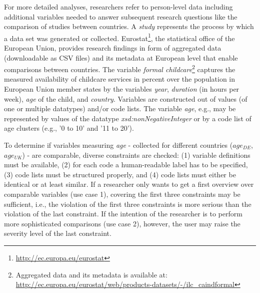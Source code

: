 \documentclass{llncs}
\begin{document}
For more detailed analyses, researchers refer to person-level data including additional variables needed to answer subsequent research questions
like the comparison of studies between countries.
A \emph{study} represents the process by which a data set was generated or collected.
Eurostat\footnote{\url{http://ec.europa.eu/eurostat}}, the statistical office of the European Union, provides research findings in form of aggregated data (downloadable as CSV files) and its metadata at European level that enable comparisons between countries.
The variable \emph{formal childcare}\footnote{Aggregated data and its metadata is available at: \url{http://ec.europa.eu/eurostat/web/products-datasets/-/ilc_caindformal}} %
captures the measured availability of childcare services in percent over the population in European Union member states by 
the variables \emph{year}, \emph{duration} (in hours per week), \emph{age} of the child, and \emph{country}.
Variables are constructed out of values (of one or multiple datatypes) and/or code lists.
The variable \emph{age}, e.g., may be represented by values of the datatype \emph{xsd:nonNegativeInteger} or by a code list of age clusters (e.g., '0 to 10' and '11 to 20'). 

To determine if variables measuring \emph{age} 
- collected for different countries (\emph{$age_{DE}$}, \emph{$age_{UK}$}) - 
are comparable, diverse constraints are checked:
(1) variable definitions must be available, 
(2) for each code a human-readable label has to be specified,
(3) code lists must be structured properly, and
(4) code lists must either be identical or at least similar.
If a researcher only wants to get a first overview over comparable variables (use case 1), 
covering the first three constraints may be sufficient,
i.e., the violation of the first three constraints is more serious than the violation of the last constraint.
If the intention of the researcher is to perform more sophisticated comparisons (use case 2), however, the user may raise the severity level of the last constraint.
 
\end{document}
